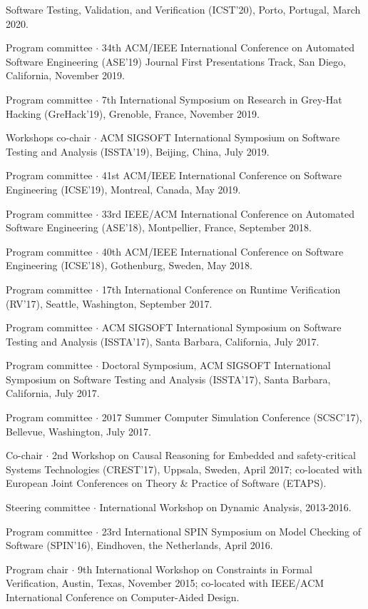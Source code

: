 \documentclass[ComputerScience]{vita}
\begin{document}
\begin{vita}
\begin{Panel and Committee Service}
  Software Testing, Validation, and Verification (ICST'20), Porto,
  Portugal, March 2020.
\item Program committee $\cdot$ 34th ACM/IEEE International Conference on Automated Software Engineering (ASE'19) Journal First Presentations Track, San Diego, California, November 2019.
\item Program committee $\cdot$ 7th International Symposium on
  Research in Grey-Hat Hacking (GreHack'19), Grenoble, France, 
  November 2019. 
\item Workshops co-chair $\cdot$ ACM SIGSOFT International Symposium on Software Testing and Analysis (ISSTA'19), Beijing, China, July 2019.
\item Program committee $\cdot$ 41st ACM/IEEE International Conference on Software Engineering (ICSE'19), Montreal, Canada, May 2019. 
\item Program committee $\cdot$ 33rd IEEE/ACM International Conference on Automated Software Engineering (ASE'18), Montpellier, France, September 2018.
\item Program committee $\cdot$ 40th ACM/IEEE International Conference on Software Engineering (ICSE'18), Gothenburg, Sweden, May 2018. 
\item Program committee $\cdot$ 17th International Conference on Runtime Verification (RV'17), Seattle, Washington, September 2017.
\item Program committee $\cdot$ ACM SIGSOFT International Symposium on Software Testing and Analysis (ISSTA'17), Santa Barbara, California, July 2017.
\item Program committee $\cdot$ Doctoral Symposium, ACM SIGSOFT International Symposium on Software Testing and Analysis (ISSTA'17), Santa Barbara, California, July 2017.
\item Program committee $\cdot$ 2017 Summer Computer Simulation Conference (SCSC'17), Bellevue, Washington, July 2017.
\item Co-chair $\cdot$  2nd Workshop on Causal Reasoning for Embedded
  and safety-critical Systems Technologies (CREST'17), Uppsala,
  Sweden, April 2017; co-located with European Joint Conferences on
  Theory \& Practice of Software (ETAPS).
\item Steering committee $\cdot$ International Workshop on Dynamic Analysis, 2013-2016.
\item Program committee $\cdot$ 23rd International SPIN Symposium on Model Checking of Software (SPIN'16), Eindhoven, the Netherlands, April 2016.
\item Program chair $\cdot$ 9th International Workshop on Constraints in Formal Verification, Austin, Texas, November 2015; co-located with IEEE/ACM International Conference on Computer-Aided Design.

\end{Panel and Committee Service}
\end{vita}
\end{document}
